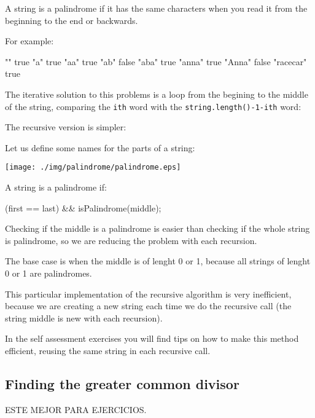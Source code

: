 \documentclass[a4paper, 9pt]{extarticle}
\begin{document}
A string is a palindrome if it has the same characters when you read it from
the beginning to the end or backwards.

For example:

\begin{blackboard}
"" true
"a" true
"aa" true
"ab" false
"aba" true
"anna" true
"Anna" false
"racecar" true
\end{blackboard}

The iterative solution to this problems is a loop from the begining to the
middle of the string, comparing the \texttt{ith} word with the
\texttt{string.length()-1-ith} word:


The recursive version is simpler:

Let us define some names for the parts of a string:

\begin{center}
\texttt{[image: ./img/palindrome/palindrome.eps]}
\end{center}

A string is a palindrome if:

\begin{blackboard}
  (first == last) && isPalindrome(middle);
\end{blackboard}

Checking if the middle is a palindrome is easier than checking if the whole
string is palindrome, so we are reducing the problem with each recursion.

The base case is when the middle is of lenght 0 or 1, because all strings of
lenght 0 or 1 are palindromes.



This particular implementation of the recursive algorithm is very inefficient,
because we are creating a new string each time we do the recursive call (the
string middle is new with each recursion).

In the self assessment exercises you will find tips on how to make this method
efficient, reusing the same string in each recursive call.


\subsection{Finding the greater common divisor}

ESTE MEJOR PARA EJERCICIOS.
\end{document}
